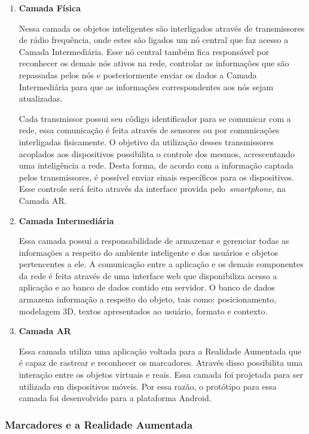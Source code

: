 	\begin{enumerate}
	  \item \textbf{Camada Física}
	  	
	  	Nessa camada os objetos inteligentes são interligados através de transmissores de rádio
	  	frequência, onde estes são ligados um nó central que faz acesso a Camada Intermediária. Esse nó
	  	central também fica responsável por reconhecer os demais nós ativos na rede, controlar as
	  	informações que são repassadas pelos nós e posteriormente enviar os dados a Camada Intermediária
	  	para que as informações correspondentes aos nós sejam atualizadas.
	  	
	  	Cada transmissor possui seu código identificador para se comunicar com a rede, essa comunicação
	  	é feita através de sensores ou por comunicações interligadas fisicamente. O objetivo da
	  	utilização desses transmissores acoplados aos dispositivos possibilita o controle dos
	  	mesmos, acrescentando uma inteligência a rede. Desta forma, de acordo com a informação captada
	  	pelos transmissores, é possível enviar sinais específicos para os dispositivos. Esse controle
	  	será feito através da interface provida pelo~\textit{smartphone}, na Camada AR.
	  
	  \item \textbf{Camada Intermediária}
	  
	  	Essa camada possui a responsabilidade de armazenar e gerenciar todas as informações a respeito
	  	do ambiente inteligente e dos usuários e objetos pertencentes a ele. A comunicação entre a
	  	aplicação e os demais componentes da rede é feita através de uma interface web que
	  	disponibiliza acesso a aplicação e ao banco de dados contido em servidor. O banco de dados
	  	armazena informação a respeito do objeto, tais como: posicionamento, modelagem 3D, textos
	  	apresentados ao usuário, formato e contexto. 
	  
	  \item \textbf{Camada AR}
	
		Essa camada utiliza uma aplicação voltada para a Realidade Aumentada que é capaz de
		rastrear e reconhecer os marcadores. Através disso possibilita uma interação entre os
		objetos virtuais e reais. Essa camada foi projetada para ser utilizada em dispositivos móveis.
		Por essa razão, o protótipo para essa camada foi desenvolvido para a plataforma Android.
		
	\end{enumerate}
	
	\subsubsection{Marcadores e a Realidade Aumentada}
	
